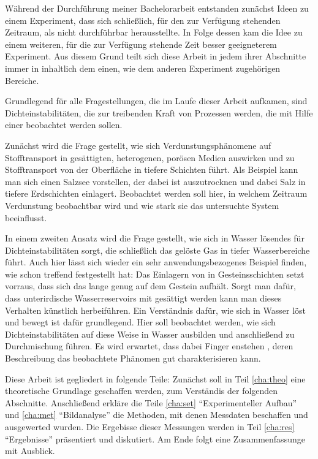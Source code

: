 
\label{cha:intro}

Während der Durchführung meiner Bachelorarbeit entstanden zunächst Ideen zu einem Experiment, dass sich schließlich, für den zur Verfügung stehenden Zeitraum, als nicht durchführbar herausstellte.
In Folge dessen kam die Idee zu einem weiteren, für die zur Verfügung stehende Zeit besser geeigneterem Experiment. Aus diesem Grund teilt sich diese Arbeit in jedem ihrer Abschnitte immer in inhaltlich dem einen, wie dem anderen Experiment zugehörigen Bereiche.

Grundlegend für alle Fragestellungen, die im Laufe dieser Arbeit aufkamen, sind Dichteinstabilitäten, die zur treibenden Kraft von Prozessen werden, die mit Hilfe einer \HSC beobachtet werden sollen.

Zunächst wird die Frage gestellt, wie sich Verdunstungsphänomene auf Stofftransport in gesättigten, heterogenen, porösen Medien auswirken und zu Stofftransport von der Oberfläche in tiefere Schichten führt. Als Beispiel kann man sich einen Salzsee vorstellen, der dabei ist auszutrocknen und dabei Salz in tiefere Erdschichten einlagert. Beobachtet werden soll hier, in welchem Zeitraum Verdunstung beobachtbar wird und wie stark sie das untersuchte System beeinflusst.

In einem zweiten Ansatz wird die Frage gestellt, wie sich in Wasser lösendes \COT für Dichteinstabilitäten sorgt, die schließlich das gelöste Gas in tiefer Wasserbereiche führt. Auch hier lässt sich wieder ein sehr anwendungsbezogenes Beispiel finden, wie schon \cite{fernandez} treffend festgestellt hat: Das Einlagern von \COT in Gesteinsschichten setzt vorraus, dass sich das \COT lange genug auf dem Gestein aufhält. Sorgt man dafür, dass unterirdische Wasserreservoirs mit \COT gesättigt werden kann man dieses Verhalten künstlich herbeiführen. Ein Verständnis dafür, wie sich \COT in Wasser löst und bewegt ist dafür grundlegend. Hier soll beobachtet werden, wie sich Dichteinstabilitäten auf diese Weise in Wasser ausbilden und anschließend zu Durchmischung führen. Es wird erwartet, dass dabei Finger enstehen , deren Beschreibung das beobachtete Phänomen gut charakterisieren kann.

Diese Arbeit ist gegliedert in folgende Teile: Zunächst soll in Teil \ref{cha:theo} eine theoretische Grundlage geschaffen werden, zum Verständis der folgenden Abschnitte. Anschließend erkläre die Teile \ref{cha:set} "`Experimenteller Aufbau"' und \ref{cha:met} "`Bildanalyse"' die Methoden, mit denen Messdaten beschaffen und ausgewerted wurden. Die Ergebisse dieser Messungen werden in Teil \ref{cha:res} "`Ergebnisse"' präsentiert und diskutiert. Am Ende folgt eine Zusammenfassunge mit Ausblick.

